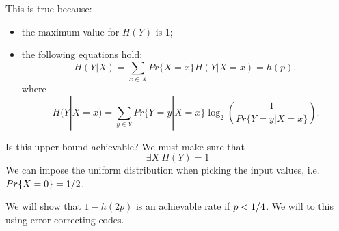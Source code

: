 This is true because:
\begin{itemize}
	\item the maximum value for $H(Y)$ is 1;
	\item the following equations hold:
	\[H(Y|X) = \sum_{x\in X}Pr\{X=x\}H(Y|X=x) = h(p),\] where 
	\[H(Y|X=x) = \sum_{y \in Y}Pr\{Y=y|X=x\}\log_2\left(\dfrac{1}{Pr\{Y=y | X=x\}} \right).\]
\end{itemize} 

Is this upper bound achievable? We must make sure that $$\exists X\ H(Y) =1$$
We can impose the uniform distribution when picking the input values, i.e. $Pr\{X = 0\} = {1}/{2}$.

We will show that $1-h(2p)$ is an achievable rate if $p < {1}/{4}$. We will to this using error correcting codes.